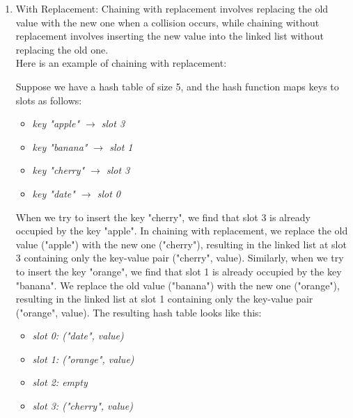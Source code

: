 \documentclass[11pt]{article}
\begin{document}
\begin{enumerate}
          \begin{enumerate}
              \item With Replacement: Chaining with replacement involves replacing the old value with the new one when a collision occurs, while chaining without replacement involves inserting the new value into the linked list without replacing the old one. \\

                    Here is an example of chaining with replacement:

                    Suppose we have a hash table of size 5, and the hash function maps keys to slots as follows: \\
                    \begin{itemize}
                        \item \textit{key "apple" $\rightarrow$ slot 3}
                        \item \textit{key "banana" $\rightarrow$ slot 1}
                        \item \textit{key "cherry" $\rightarrow$ slot 3}
                        \item \textit{key "date" $\rightarrow$ slot 0 \\}
                    \end{itemize}

                    When we try to insert the key "cherry", we find that slot 3 is already occupied by the key "apple". In chaining with replacement, we replace the old value ("apple") with the new one ("cherry"), resulting in the linked list at slot 3 containing only the key-value pair ("cherry", value). Similarly, when we try to insert the key "orange", we find that slot 1 is already occupied by the key "banana". We replace the old value ("banana") with the new one ("orange"), resulting in the linked list at slot 1 containing only the key-value pair ("orange", value). The resulting hash table looks like this: \\
                    \begin{itemize}
                        \item \textit{slot 0: ("date", value)}
                        \item \textit{slot 1: ("orange", value)}
                        \item \textit{slot 2: empty}
                        \item \textit{slot 3: ("cherry", value)\\}
                    \end{itemize}


\end{enumerate}
\end{enumerate}
\end{document}
